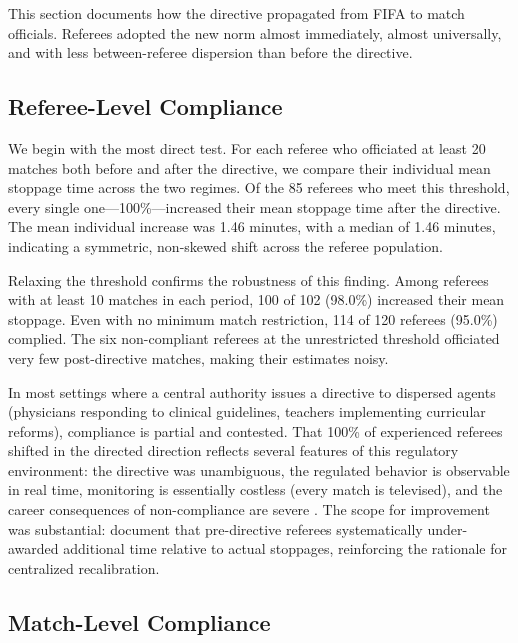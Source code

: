 \documentclass[12pt]{article}
\begin{document}
This section documents how the directive propagated from FIFA to match officials. Referees adopted the new norm almost immediately, almost universally, and with less between-referee dispersion than before the directive.

\subsection{Referee-Level Compliance}
\label{subsec:ref_level_compliance}

We begin with the most direct test. For each referee who officiated at least 20 matches both before and after the directive, we compare their individual mean stoppage time across the two regimes. Of the 85 referees who meet this threshold, every single one---100\%---increased their mean stoppage time after the directive. The mean individual increase was 1.46 minutes, with a median of 1.46 minutes, indicating a symmetric, non-skewed shift across the referee population.

Relaxing the threshold confirms the robustness of this finding. Among referees with at least 10 matches in each period, 100 of 102 (98.0\%) increased their mean stoppage. Even with no minimum match restriction, 114 of 120 referees (95.0\%) complied. The six non-compliant referees at the unrestricted threshold officiated very few post-directive matches, making their estimates noisy.

In most settings where a central authority issues a directive to dispersed agents (physicians responding to clinical guidelines, teachers implementing curricular reforms), compliance is partial and contested. That 100\% of experienced referees shifted in the directed direction reflects several features of this regulatory environment: the directive was unambiguous, the regulated behavior is observable in real time, monitoring is essentially costless (every match is televised), and the career consequences of non-compliance are severe \citep[cf.][on the role of monitoring in regulatory compliance]{duflo2013truth}. The scope for improvement was substantial: \citet{forcher2024additional} document that pre-directive referees systematically under-awarded additional time relative to actual stoppages, reinforcing the rationale for centralized recalibration.

\subsection{Match-Level Compliance}
\label{subsec:match_level_compliance}
\end{document}
